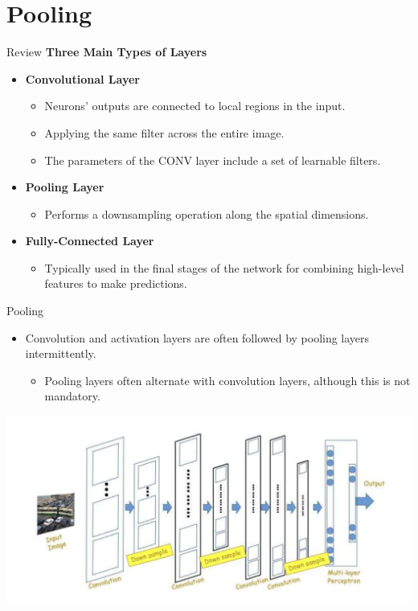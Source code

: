\documentclass[default, aspectratio=169]{beamer}
\begin{document}
	\section{Pooling}
	\begin{frame}{Review}
		\textbf{Three Main Types of Layers}
		\begin{itemize}
			\item \textbf{Convolutional Layer}
			\begin{itemize}
				\item Neurons' outputs are connected to local regions in the input.
				\item Applying the same filter across the entire image.
				\item The parameters of the CONV layer include a set of learnable filters.
			\end{itemize}
			\item \textbf{Pooling Layer}
			\begin{itemize}
				\item Performs a downsampling operation along the spatial dimensions.
			\end{itemize}
			\item \textbf{Fully-Connected Layer}
			\begin{itemize}
				\item Typically used in the final stages of the network for combining high-level features to make predictions.
			\end{itemize}
		\end{itemize}
	\end{frame}
	\begin{frame}{Pooling}
		\begin{itemize}
			\item Convolution and activation layers are often followed by pooling layers intermittently.
			
			\begin{itemize}
				\item Pooling layers often alternate with convolution layers, although this is not mandatory.
			\end{itemize}
		\end{itemize}
		\centering
		\includegraphics[keepaspectratio, scale=0.5]{pic/pooling.png}
	\end{frame}
\end{document}
